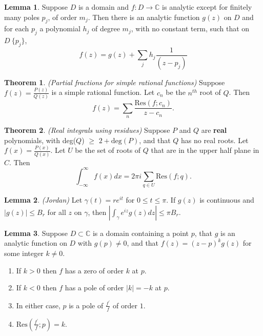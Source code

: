 \documentclass[a4paper]{article}
\theoremstyle{definition}
\newtheorem{theorem}{Theorem}
\newtheorem{lemma}{Lemma}
\begin{document}
	\begin{lemma}
		Suppose $D$ is a domain and $f: D \rightarrow \mathbb{C}$ is analytic except for finitely many poles $p_{j}$, of order $m_{j}$. Then there is an analytic function $g(z)$ on $D$ and for each $p_{j}$ a polynomial $h_{j}$ of degree $m_{j}$, with no constant term, such that on $D \ \{ p_{j} \}$,
		$$f(z) = g(z) + \sum_{j} h_{j} \frac{1}{(z-p_{j})}$$
	\end{lemma}
	
	\begin{theorem}
		\emph{(Partial fractions for simple rational functions)}
		Suppose $f(z) = \frac{P(z)}{Q(z)}$ is a simple rational function. Let $c_{n}$ be the $n^{th}$ root of $Q$. Then
		$$f(z) = \sum_{n} \frac{\text{Res}(f; c_{n})}{z - c_{n}}.$$
	\end{theorem}
	
	\begin{theorem}
		\emph{(Real integrals using residues)}
		Suppose $P$ and $Q$ are \textbf{real} polynomials, with deg($Q$) $\geq$ $2 + \text{deg}(P)$, and that $Q$ has no real roots. Let $f(x) = \frac{P(x)}{Q(x)}$. Let $U$ be the set of roots of $Q$ that are in the upper half plane in $C$. Then
		$$\int_{-\infty}^{\infty} f(x) dx = 2 \pi i \sum_{q \in U} \text{Res}(f; q).$$
	\end{theorem}
	
	\begin{lemma}
		\emph{(Jordan)}
		Let $\gamma(t) = r e^{it}$ for $0 \leq t \leq \pi$. If $g(z)$ is continuous and $|g(z)| \leq B_{r}$ for all $z$ on $\gamma$, then $|\int_{\gamma} e^{iz} g(z) dz| \leq \pi B_{r}$.
	\end{lemma}
	
	\begin{lemma}
		Suppose $D \subset \mathbb{C}$ is a domain containing a point $p$, that $g$ is an analytic function on $D$ with $g(p) \neq 0$, and that $f(z) = (z-p)^{k}g(z)$ for some integer $k \neq 0$.
		\begin{enumerate}[label=\alph*.]
			\item If $k > 0$ then $f$ has a zero of order $k$ at $p$.
			\item If $k < 0$ then $f$ has a pole of order $|k| = -k$ at $p$.
			\item In either case, $p$ is a pole of $\frac{f^{\prime}}{f}$ of order $1$.
			\item $\text{Res}(\frac{f^{\prime}}{f}; p) = k$.
		\end{enumerate}
	\end{lemma}
	
\end{document}
